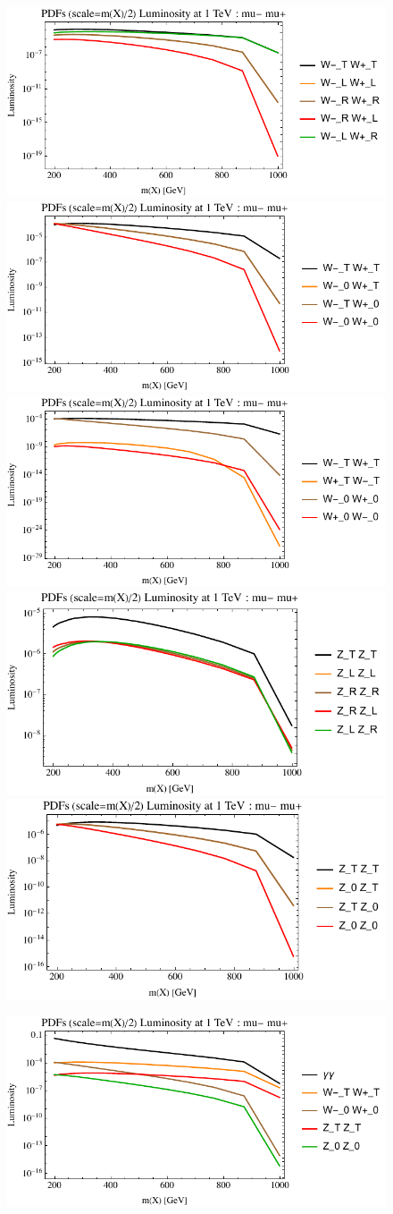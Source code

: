 \documentclass[a4paper,11pt]{article}
\begin{document}
\begin{figure}[ht]
\includegraphics[width=0.4\linewidth]{PlotLumi/1TeV/lumis/plotWWpolRandL.pdf}
\includegraphics[width=0.4\linewidth]{PlotLumi/1TeV/lumis/plotWWpolTand0.pdf}
\includegraphics[width=0.4\linewidth]{PlotLumi/1TeV/lumis/plotWmWpandWpWm.pdf}
\includegraphics[width=0.4\linewidth]{PlotLumi/1TeV/lumis/plotZZpolRandL.pdf}
\includegraphics[width=0.4\linewidth]{PlotLumi/1TeV/lumis/plotZZpolTand0.pdf}
\end{figure}

\begin{figure}
\includegraphics[width=0.4\linewidth]{PlotLumi/1TeV/lumis/plotgammaWZ.pdf}
\end{figure}
\end{document}
